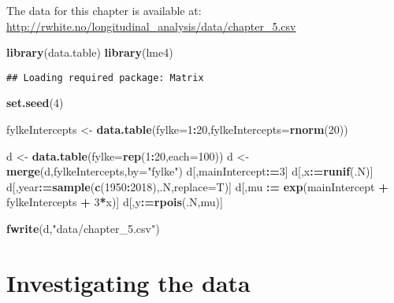 \documentclass[]{book}
\newenvironment{Shaded}{\begin{snugshade}}{\end{snugshade}}
\newcommand{\KeywordTok}[1]{\textcolor[rgb]{0.13,0.29,0.53}{\textbf{#1}}}
\newcommand{\DataTypeTok}[1]{\textcolor[rgb]{0.13,0.29,0.53}{#1}}
\newcommand{\DecValTok}[1]{\textcolor[rgb]{0.00,0.00,0.81}{#1}}
\newcommand{\StringTok}[1]{\textcolor[rgb]{0.31,0.60,0.02}{#1}}
\newcommand{\OperatorTok}[1]{\textcolor[rgb]{0.81,0.36,0.00}{\textbf{#1}}}
\newcommand{\ErrorTok}[1]{\textcolor[rgb]{0.64,0.00,0.00}{\textbf{#1}}}
\newcommand{\NormalTok}[1]{#1}
\begin{document}
The data for this chapter is available at:
\url{http://rwhite.no/longitudinal_analysis/data/chapter_5.csv}

\begin{Shaded}
\begin{Highlighting}[]
\KeywordTok{library}\NormalTok{(data.table)}
\KeywordTok{library}\NormalTok{(lme4)}
\end{Highlighting}
\end{Shaded}

\begin{verbatim}
## Loading required package: Matrix
\end{verbatim}

\begin{Shaded}
\begin{Highlighting}[]
\KeywordTok{set.seed}\NormalTok{(}\DecValTok{4}\NormalTok{)}

\NormalTok{fylkeIntercepts <-}\StringTok{ }\KeywordTok{data.table}\NormalTok{(}\DataTypeTok{fylke=}\DecValTok{1}\OperatorTok{:}\DecValTok{20}\NormalTok{,}\DataTypeTok{fylkeIntercepts=}\KeywordTok{rnorm}\NormalTok{(}\DecValTok{20}\NormalTok{))}

\NormalTok{d <-}\StringTok{ }\KeywordTok{data.table}\NormalTok{(}\DataTypeTok{fylke=}\KeywordTok{rep}\NormalTok{(}\DecValTok{1}\OperatorTok{:}\DecValTok{20}\NormalTok{,}\DataTypeTok{each=}\DecValTok{100}\NormalTok{))}
\NormalTok{d <-}\StringTok{ }\KeywordTok{merge}\NormalTok{(d,fylkeIntercepts,}\DataTypeTok{by=}\StringTok{"fylke"}\NormalTok{)}
\NormalTok{d[,mainIntercept}\OperatorTok{:}\ErrorTok{=}\DecValTok{3}\NormalTok{]}
\NormalTok{d[,x}\OperatorTok{:}\ErrorTok{=}\KeywordTok{runif}\NormalTok{(.N)]}
\NormalTok{d[,year}\OperatorTok{:}\ErrorTok{=}\KeywordTok{sample}\NormalTok{(}\KeywordTok{c}\NormalTok{(}\DecValTok{1950}\OperatorTok{:}\DecValTok{2018}\NormalTok{),.N,}\DataTypeTok{replace=}\NormalTok{T)]}
\NormalTok{d[,mu }\OperatorTok{:}\ErrorTok{=}\StringTok{ }\KeywordTok{exp}\NormalTok{(mainIntercept }\OperatorTok{+}\StringTok{ }\NormalTok{fylkeIntercepts }\OperatorTok{+}\StringTok{ }\DecValTok{3}\OperatorTok{*}\NormalTok{x)]}
\NormalTok{d[,y}\OperatorTok{:}\ErrorTok{=}\KeywordTok{rpois}\NormalTok{(.N,mu)]}

\KeywordTok{fwrite}\NormalTok{(d,}\StringTok{"data/chapter_5.csv"}\NormalTok{)}
\end{Highlighting}
\end{Shaded}

\newpage

\section{Investigating the data}\label{investigating-the-data}
\end{document}
